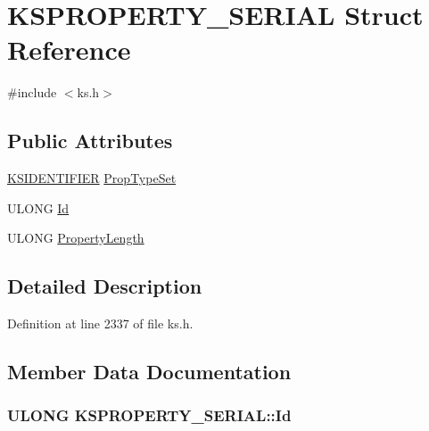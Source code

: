 \hypertarget{struct_k_s_p_r_o_p_e_r_t_y___s_e_r_i_a_l}{}\section{K\+S\+P\+R\+O\+P\+E\+R\+T\+Y\+\_\+\+S\+E\+R\+I\+AL Struct Reference}
\label{struct_k_s_p_r_o_p_e_r_t_y___s_e_r_i_a_l}


{\ttfamily \#include $<$ks.\+h$>$}

\subsection*{Public Attributes}
\begin{DoxyCompactItemize}
\item 
\hyperlink{struct_k_s_i_d_e_n_t_i_f_i_e_r}{K\+S\+I\+D\+E\+N\+T\+I\+F\+I\+ER} \hyperlink{struct_k_s_p_r_o_p_e_r_t_y___s_e_r_i_a_l_ad0928d5b4c3338dd7d134aa3b4b4f79e}{Prop\+Type\+Set}
\item 
U\+L\+O\+NG \hyperlink{struct_k_s_p_r_o_p_e_r_t_y___s_e_r_i_a_l_adc889d39fd9d33a11e0b9e861097a9de}{Id}
\item 
U\+L\+O\+NG \hyperlink{struct_k_s_p_r_o_p_e_r_t_y___s_e_r_i_a_l_a866564670e9e54eaaa898db8b938123f}{Property\+Length}
\end{DoxyCompactItemize}


\subsection{Detailed Description}


Definition at line 2337 of file ks.\+h.



\subsection{Member Data Documentation}
\subsubsection[{\texorpdfstring{Id}{Id}}]{\setlength{\rightskip}{0pt plus 5cm}U\+L\+O\+NG K\+S\+P\+R\+O\+P\+E\+R\+T\+Y\+\_\+\+S\+E\+R\+I\+A\+L\+::\+Id}\hypertarget{struct_k_s_p_r_o_p_e_r_t_y___s_e_r_i_a_l_adc889d39fd9d33a11e0b9e861097a9de}{}\label{struct_k_s_p_r_o_p_e_r_t_y___s_e_r_i_a_l_adc889d39fd9d33a11e0b9e861097a9de}


